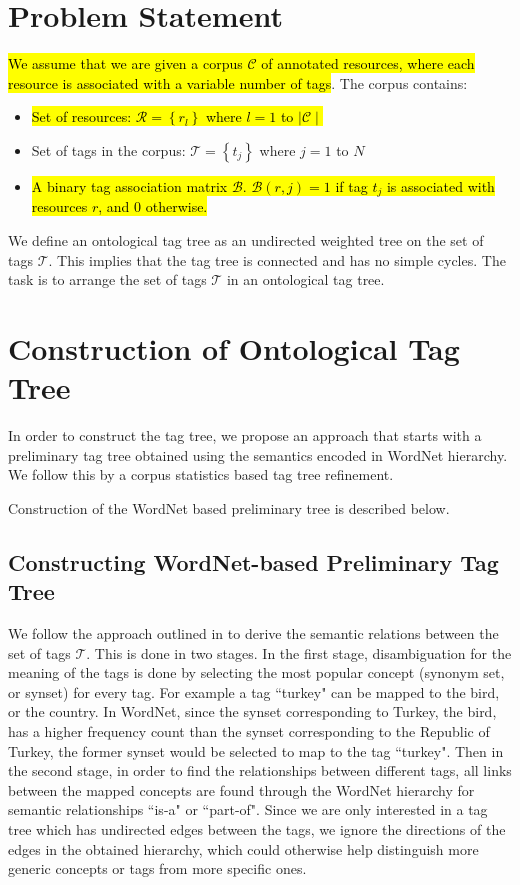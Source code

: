\section{Problem Statement} \label{sec:Formulation}
\hl{We assume that we are given a corpus $\mathscr{C}$ of annotated resources, where each resource is associated with a variable number of tags}. The corpus contains:
\begin{itemize}
\item \hl{Set of resources: $\mathcal{R}=\left\{ r_l \right\}$ where $l=1$ to $\mid\mathscr{C}\mid$}
\item Set of tags in the corpus: $\mathcal{T}=\left\{t_j \right\}$ where $j=1$ to $N$ 
\item \hl{A binary tag association matrix $\mathcal{B}$. $\mathcal{B}(r,j)=1$ if tag $t_j$ is associated with resources $r$, and $0$ otherwise. }
\end{itemize}
We define an ontological tag tree as an undirected weighted tree on the set of tags $\mathcal{T}$. This implies that the tag tree is connected and has no simple cycles. The task is to arrange the set of tags $\mathcal{T}$ in an ontological tag tree. 


\section{Construction of Ontological Tag Tree}
\label{sec:ConstructionTree}
In order to construct the tag tree, we propose an approach that starts with a preliminary tag tree obtained using the semantics encoded in WordNet hierarchy. We follow this by a corpus statistics based tag tree refinement.

Construction of the WordNet based preliminary tree is described below. 

\subsection{Constructing WordNet-based Preliminary Tag Tree}
\label{sec:WordNetGraph}
We follow the approach outlined in \cite{WordnetHierarchyConstruct} to derive the semantic relations between the set of tags $\mathcal{T}$. This is done in two stages. In the first stage, disambiguation for the meaning of the tags is done by selecting the most popular concept (synonym set, or synset) for every tag. For example a tag ``turkey" can be mapped to the bird, or the country. In WordNet, since the synset corresponding to Turkey, the bird, has a higher frequency count than the synset corresponding to the Republic of Turkey, the former synset would be selected to map to the tag ``turkey". Then in the second stage, in order to find the relationships between different tags, all links between the mapped concepts are found through the WordNet hierarchy for semantic relationships ``is-a" or ``part-of". Since we are only interested in a tag tree which has undirected edges between the tags, we ignore the directions of the edges in the obtained hierarchy, which could otherwise help distinguish more generic concepts or tags from more specific ones. 

